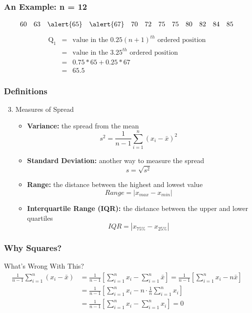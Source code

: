 \documentclass[handout]{beamer}
\begin{document}
\begin{frame}
\frametitle{An Example: n = 12}
	$$
	\begin{array}{cccccccccccc}
		60 & 63 & \alert{65} & \alert{67} & 70 & 72 & 75 & 75 & 80 & 82 & 84 & 85
	\end{array}
	$$
	\begin{eqnarray*}
		\mbox{Q}_1 &=& \mbox{value in the } 0.25(n+1)^{th}\mbox{ ordered position}\\
			&=& \mbox{value in the } 3.25^{th}\mbox{ ordered position}\\
			&=& 0.75 * 65 + 0.25 * 67\\
			&=& 65.5
	\end{eqnarray*}
\end{frame}

\begin{frame}
\frametitle{Definitions}
	\begin{enumerate}
	\setcounter{enumi}{2}
		\item Measures of Spread
		\begin{itemize}
			\item \textbf{Variance:} the spread from the mean
			$$
			s^2 = \frac{1}{n-1} \sum_{i = 1}^n (x_i - \bar{x})^2
			$$
			\item \textbf{Standard Deviation:} another way to measure the spread
			$$
			s = \sqrt{s^2}
			$$
			\item \textbf{Range:} the distance between the highest and lowest value
			$$
			Range = \left| x_{max} - x_{min} \right|
			$$
			\item \textbf{Interquartile Range (IQR):} the distance between the upper and lower 					quartiles
			$$
			IQR = \left| x_{75\%} - x_{25\%} \right|
			$$
		\end{itemize}
	\end{enumerate}
\end{frame}

 \begin{frame}
 \frametitle{Why Squares?}
	 \begin{center}
	 \end{center}
	 \begin{alertblock}{What's Wrong With This?}
	 	\begin{align*}
	 		\frac{1}{n - 1} \sum_{i = 1}^n (x_i - \bar{x}) &= \frac{1}{n - 1} \left[\sum_{i = 1}^n x_i - 					\sum_{i = 1}^n \bar{x} \right] = \frac{1}{n - 1} \left[ \sum_{i = 1}^n x_i  - n\bar{x} \right]
	 		\\
	 		&= \frac{1}{n - 1} \left[ \sum_{i = 1}^n x_i  - n \cdot \frac{1}{n} \sum_{i = 1}^n x_i \right]
	 		\\ 
	 		&= \frac{1}{n - 1} \left[ \sum_{i = 1}^n x_i  -  \sum_{i = 1}^n x_i \right] = 0
	 	\end{align*}
	 \end{alertblock}
\end{frame}
\end{document}

